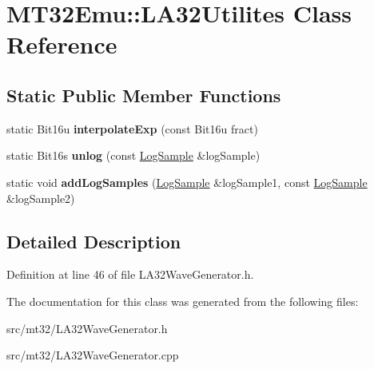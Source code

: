 \hypertarget{classMT32Emu_1_1LA32Utilites}{\section{M\-T32\-Emu\-:\-:L\-A32\-Utilites Class Reference}
\label{classMT32Emu_1_1LA32Utilites}
}
\subsection*{Static Public Member Functions}
\begin{DoxyCompactItemize}
\item 
\hypertarget{classMT32Emu_1_1LA32Utilites_ac3c96d79dc858dc402d129a1cdd0b5e7}{static Bit16u {\bfseries interpolate\-Exp} (const Bit16u fract)}\label{classMT32Emu_1_1LA32Utilites_ac3c96d79dc858dc402d129a1cdd0b5e7}

\item 
\hypertarget{classMT32Emu_1_1LA32Utilites_a24070363260d5205d78b3a2fbc7cbaa7}{static Bit16s {\bfseries unlog} (const \hyperlink{structMT32Emu_1_1LogSample}{Log\-Sample} \&log\-Sample)}\label{classMT32Emu_1_1LA32Utilites_a24070363260d5205d78b3a2fbc7cbaa7}

\item 
\hypertarget{classMT32Emu_1_1LA32Utilites_a97b09fe25cd0705cf811ae4203355713}{static void {\bfseries add\-Log\-Samples} (\hyperlink{structMT32Emu_1_1LogSample}{Log\-Sample} \&log\-Sample1, const \hyperlink{structMT32Emu_1_1LogSample}{Log\-Sample} \&log\-Sample2)}\label{classMT32Emu_1_1LA32Utilites_a97b09fe25cd0705cf811ae4203355713}

\end{DoxyCompactItemize}


\subsection{Detailed Description}


Definition at line 46 of file L\-A32\-Wave\-Generator.\-h.



The documentation for this class was generated from the following files\-:\begin{DoxyCompactItemize}
\item 
src/mt32/L\-A32\-Wave\-Generator.\-h\item 
src/mt32/L\-A32\-Wave\-Generator.\-cpp\end{DoxyCompactItemize}
